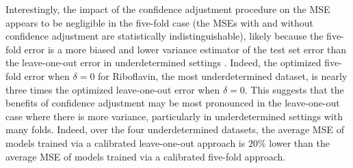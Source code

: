\documentclass[mnsc,nonblindrev]{informs3} %
\begin{document}
Interestingly, the impact of the confidence adjustment procedure on the MSE appears to be negligible in the five-fold case (the MSEs with and without confidence adjustment are statistically indistinguishable), likely because the five-fold error is a more biased and lower variance estimator of the test set error than the leave-one-out error in underdetermined settings \citep{hastie2009elements}. Indeed, the optimized five-fold error when $\delta=0$ for Riboflavin, the most underdetermined dataset, is nearly three times the optimized leave-one-out error when $\delta=0$. This suggests that the benefits of confidence adjustment may be most pronounced in the leave-one-out case where there is more variance, particularly in underdetermined settings with many folds. Indeed, over the four underdetermined datasets, the average MSE of models trained via a calibrated leave-one-out approach is $20\%$ lower than the average MSE of models trained via a calibrated five-fold approach.
\end{document}
